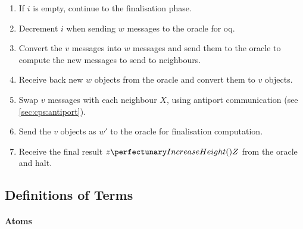 \begin{enumerate}
    \item If \(i\) is empty, continue to the finalisation phase.
    \item Decrement \(i\) when sending \(w\) messages to the oracle for \gls{oq}.
    \item Convert the \(v\) messages into \(w\) messages and send them to the oracle to compute the new messages to send to neighbours.
    \item Receive back new \(w\) objects from the oracle and convert them to \(v\) objects.
    \item Swap \(v\) messages with each neighbour \(X\), using antiport communication (see \cref{sec:cps:antiport}).
    \item Send the \(v\) objects as \(w'\) to the oracle for finalisation computation.
    \item Receive the final result \(\cpfunc{z}{Z}\) from the oracle and halt.%
\end{enumerate}

\subsection{\label{sec:nmp:systemwide:definitions}Definitions of Terms}

\paragraph{Atoms}
\begin{description}
\end{description}

